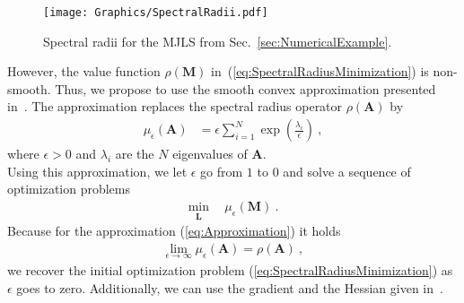 \documentclass[preprint,1p,11pt]{IR-Template/ISAS_IR}
\newcommand{\mat}[1]{{\ensuremath{{\mathbf{#1}}}}}
\newcommand{\klammer}[1]{\left( #1 \right)}
\newcommand{\spectralradius}[1]{\rho\klammer{#1}}
\newcommand{\bigM}{\mat{M}}
\newcommand{\ControlLaw}{\mat{L}}
\begin{document}
\begin{figure}
\centering
\texttt{[image: Graphics/SpectralRadii.pdf]}
\caption{Spectral radii for the MJLS from Sec.~\ref{sec:NumericalExample}.}
\label{fig:SpectralRadii}
\end{figure}

However, the value function $\spectralradius{\mat{M}}$ in~(\ref{eq:SpectralRadiusMinimization}) is non-smooth. Thus, we propose to use the smooth convex approximation presented in~\cite{Chen_2004}. The approximation replaces the spectral radius operator $\spectralradius{\mat{A}}$ by
\begin{align}
\mu_\epsilon(\mat{A})
	&=
	\epsilon \sum\limits_{i=1}^{N} \exp\klammer{\frac{\lambda_i}{\epsilon}}\ ,
\label{eq:Approximation}
\end{align}
where $\epsilon>0$ and $\lambda_i$ are the $N$ eigenvalues of $\mat{A}$.\\

Using this approximation, we let $\epsilon$ go from $1$ to $0$ and solve a sequence of optimization problems
\begin{align*}
\min\limits_{\ControlLaw}\ &\ \mu_\epsilon(\bigM)\ .
\end{align*}
Because for the approximation (\ref{eq:Approximation}) it holds
\begin{align*}
\lim\limits_{\epsilon\rightarrow\infty} \mu_\epsilon(\mat{A}) = \spectralradius{\mat{A}}\ ,
\end{align*}
we recover the initial optimization problem (\ref{eq:SpectralRadiusMinimization}) as $\epsilon$ goes to zero. Additionally, we can use the gradient and the Hessian given in~\cite{Chen_2004}.     
    
    
\end{document}
